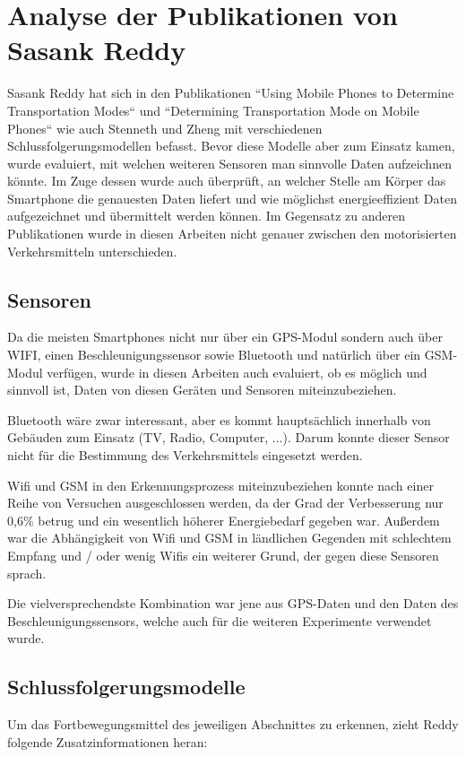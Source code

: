 \section{Analyse der Publikationen von Sasank Reddy}
Sasank Reddy hat sich in den Publikationen ``Using Mobile Phones to Determine Transportation Modes`` \cite{reddy_using_2010} und ``Determining Transportation Mode on Mobile Phones`` \cite{reddy_determining_2008} wie auch Stenneth und Zheng mit verschiedenen Schlussfolgerungsmodellen befasst. Bevor diese Modelle aber zum Einsatz kamen, wurde evaluiert, mit welchen weiteren Sensoren man sinnvolle Daten aufzeichnen könnte. Im Zuge dessen wurde auch überprüft, an welcher Stelle am Körper das Smartphone die genauesten Daten liefert und wie möglichst energieeffizient Daten aufgezeichnet und übermittelt werden können. Im Gegensatz zu anderen Publikationen wurde in diesen Arbeiten nicht genauer zwischen den motorisierten Verkehrsmitteln unterschieden.

\subsection{Sensoren}
Da die meisten Smartphones nicht nur über ein GPS-Modul sondern auch über WIFI, einen Beschleunigungssensor sowie Bluetooth und natürlich über ein GSM-Modul verfügen, wurde in diesen Arbeiten auch evaluiert, ob es möglich und sinnvoll ist, Daten von diesen Geräten und Sensoren miteinzubeziehen. 

Bluetooth  wäre zwar interessant, aber es kommt hauptsächlich innerhalb von Gebäuden zum Einsatz (TV, Radio, Computer, ...). Darum konnte dieser Sensor nicht für die Bestimmung des Verkehrsmittels eingesetzt werden. 

Wifi und GSM in den Erkennungsprozess miteinzubeziehen konnte nach einer Reihe von Versuchen ausgeschlossen werden, da der Grad der Verbesserung nur 0,6\% betrug und ein wesentlich höherer Energiebedarf gegeben war. Außerdem war die Abhängigkeit von Wifi und GSM in ländlichen Gegenden mit schlechtem Empfang und / oder wenig Wifis ein weiterer Grund, der gegen diese Sensoren sprach.

Die vielversprechendste Kombination war jene aus GPS-Daten und den Daten des Beschleunigungssensors, welche auch  für die weiteren Experimente verwendet wurde.

\subsection{Schlussfolgerungsmodelle}
Um das Fortbewegungsmittel des jeweiligen Abschnittes zu erkennen, zieht Reddy folgende Zusatzinformationen heran:

